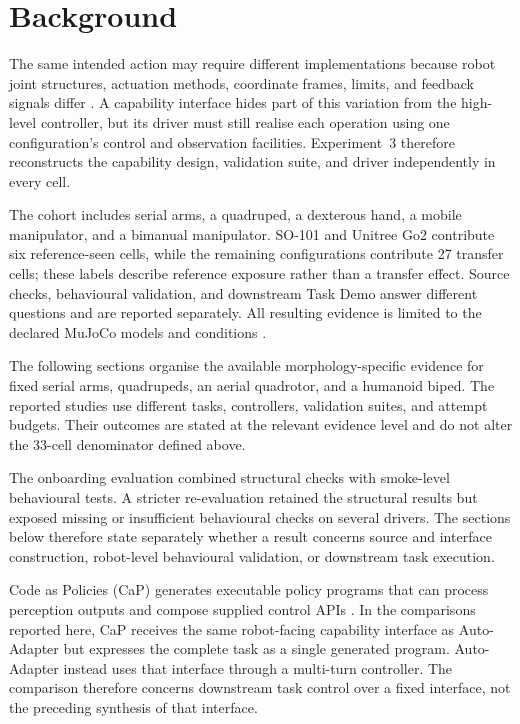 \section[Background]{Background}

The same intended action may require different implementations because robot
joint structures, actuation methods, coordinate frames, limits, and feedback
signals differ \citep{zech2019action,pantano2022capabilitysurvey}. A capability
interface hides part of this variation from the high-level controller, but its
driver must still realise each operation using one configuration's control and
observation facilities. Experiment~3 therefore reconstructs the capability
design, validation suite, and driver independently in every cell.

The cohort includes serial arms, a quadruped, a dexterous hand, a mobile
manipulator, and a bimanual manipulator. SO-101 and Unitree Go2 contribute six
reference-seen cells, while the remaining configurations contribute 27
transfer cells; these labels describe reference exposure rather than a transfer
effect. Source checks, behavioural validation, and downstream Task Demo answer
different questions and are reported separately. All resulting evidence is
limited to the declared MuJoCo models and conditions
\citep{todorov2012mujoco}.

The following sections organise the available morphology-specific evidence for
fixed serial arms, quadrupeds, an aerial quadrotor, and a humanoid biped. The
reported studies use different tasks, controllers, validation suites, and
attempt budgets. Their outcomes are stated at the relevant evidence level and
do not alter the 33-cell denominator defined above.

The onboarding evaluation combined structural checks with smoke-level
behavioural tests. A stricter re-evaluation retained the structural results but
exposed missing or insufficient behavioural checks on several drivers. The
sections below therefore state separately whether a result concerns source and
interface construction, robot-level behavioural validation, or downstream task
execution.

Code as Policies (CaP) generates executable policy programs that can process
perception outputs and compose supplied control APIs
\citep{liang2023codeaspolicies}. In the comparisons reported here, CaP
receives the same robot-facing capability interface as Auto-Adapter but
expresses the complete task as a single generated program. Auto-Adapter
instead uses that interface through a multi-turn controller. The comparison
therefore concerns downstream task control over a fixed interface, not the
preceding synthesis of that interface.


